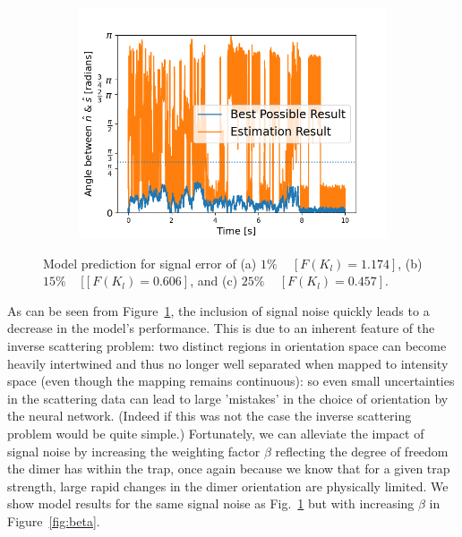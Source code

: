 \documentclass[final,  3p]{elsarticle}
\begin{document}
\begin{figure}[h]
\begin{subfigure}{0.32\textwidth}
		\includegraphics[width=\textwidth]{./Images/fig6c.png}
	\end{subfigure}
	\caption{Model prediction for signal error of (a) $1\%$ ~  $[F(K_l)=1.174]$, (b) $15\%$ ~ [$[F(K_l)=0.606]$, and (c) $25\%$ ~  $[F(K_l)=0.457]$.}
	\label{fig:epsilon}
\end{figure}

As can be seen from Figure~\ref{fig:epsilon}, the inclusion of signal noise quickly leads to a decrease in the model's performance. This is due to an inherent feature of the inverse scattering problem: two distinct regions in orientation space can become heavily intertwined and thus no longer well separated when mapped to intensity space (even though the mapping remains  continuous): so even small uncertainties in the scattering data can lead to large 'mistakes' in the choice of orientation by the neural network. (Indeed if this was not the case the inverse scattering problem would be quite simple.) Fortunately, we can alleviate the impact of signal noise by increasing the weighting factor $\beta$ reflecting the degree of freedom the dimer has within the trap, once again because we know that for a given trap strength, large rapid changes in the dimer orientation are physically limited. We show model results for the same signal noise as Fig.~\ref{fig:epsilon} but with increasing $\beta$ in Figure~\ref{fig:beta}.
\end{document}
